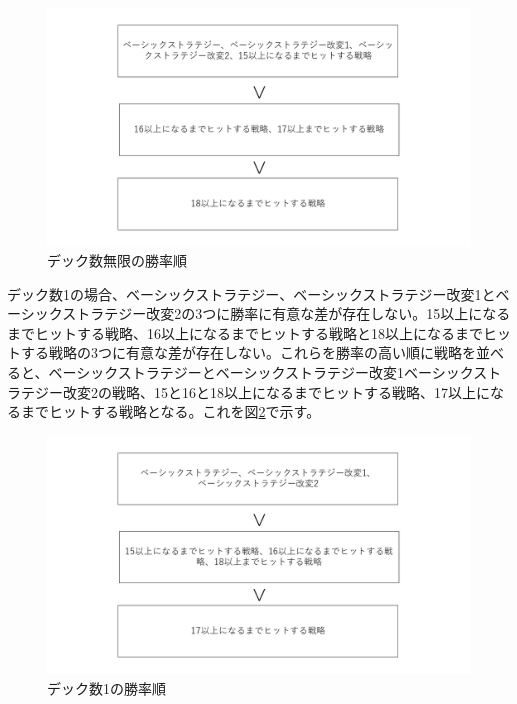 \begin{figure}[H]
 \begin{center} 
  \includegraphics[width=0.7\linewidth]{./figure/rate1}
  \caption{デック数無限の勝率順\label{rate1}}
 \end{center}
\end{figure}

デック数1の場合、ベーシックストラテジー、ベーシックストラテジー改変1とベーシックストラテジー改変2の3つに勝率に有意な差が存在しない。15以上になるまでヒットする戦略、16以上になるまでヒットする戦略と18以上になるまでヒットする戦略の3つに有意な差が存在しない。これらを勝率の高い順に戦略を並べると、ベーシックストラテジーとベーシックストラテジー改変1ベーシックストラテジー改変2の戦略、15と16と18以上になるまでヒットする戦略、17以上になるまでヒットする戦略となる。これを図\ref{rate2}で示す。

\begin{figure}[H]
 \begin{center} 
  \includegraphics[width=0.7\linewidth]{./figure/rate2}
  \caption{デック数1の勝率順\label{rate2}}
 \end{center}
\end{figure}

